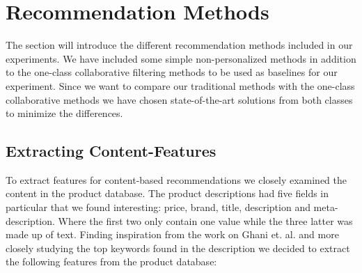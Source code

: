 
\section{Recommendation Methods}
\label{sec:rec-models}

The section will introduce the different recommendation methods included in our
experiments. We have included some simple non-personalized methods in addition
to the one-class collaborative filtering methods to be used as baselines for
our experiment. Since we want to compare our traditional methods with the one-class
collaborative methods we have chosen state-of-the-art solutions from both classes
to minimize the differences.




\subsection{Extracting Content-Features}

To extract features for content-based recommendations we closely examined the content in the product database.
The product descriptions had five fields in particular that we found interesting: price, brand, title, description
and meta-description. Where the first two only contain one value while the three latter was made up of text.
Finding inspiration from the work on Ghani et. al. \cite{ghani2002building} and more closely studying the top keywords
found in the description we decided to extract the following features from the product database:

